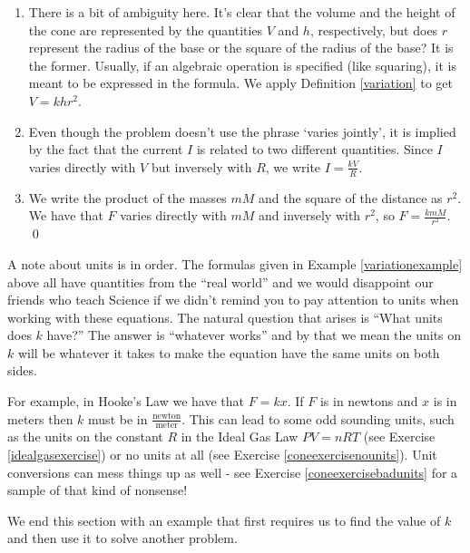\begin{ex}
\begin{enumerate}
\item  There is a bit of ambiguity here.  It's clear that the volume and the height of the cone are represented by the quantities $V$ and $h$, respectively, but does $r$ represent the radius of the base or the square of the radius of the base?  It is the former.  Usually, if an algebraic operation is specified (like squaring), it is meant to be expressed in the formula.  We apply Definition \ref{variation} to get $V = k h r^{2}$.  

\item  Even though the problem doesn't use the phrase `varies jointly', it is implied by the fact that the current $I$ is related to two different quantities.  Since $I$ varies directly with $V$ but inversely with $R$, we write $I = \frac{k V}{R}$.

\item We write the product of the masses $mM$ and the square of the distance as $r^2$.  We have that $F$ varies directly with $mM$ and inversely with $r^2$, so $F = \frac{kmM}{r^2}$.  \qed

\end{enumerate}

\end{ex}

\medskip

A note about units is in order.  The formulas given in Example \ref{variationexample} above all have quantities from the ``real world'' and we would disappoint our friends who teach Science if we didn't remind you to pay attention to units when working with these equations.  The natural question that arises is ``What units does $k$ have?''  The answer is ``whatever works'' and by that we mean the units on $k$ will be whatever it takes to make the equation have the same units on both sides.

\medskip 

For example, in Hooke's Law we have that $F = kx$.  If $F$ is in newtons and $x$ is in meters then $k$ must be in $\frac{\text{newton}}{\text{meter}}$.  This can lead to some odd sounding units, such as the units on the constant $R$ in the Ideal Gas Law $PV = nRT$ (see Exercise \ref{idealgasexercise}) or no units at all (see Exercise \ref{coneexercisenounits}).  Unit conversions can mess things up as well - see Exercise \ref{coneexercisebadunits} for a sample of that kind of nonsense!

\medskip

We end this section with an example that first requires us to find the value of $k$ and then use it to solve another problem.


